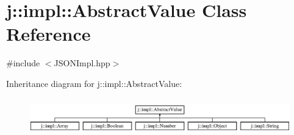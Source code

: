 \hypertarget{classj_1_1impl_1_1_abstract_value}{\section{j\-:\-:impl\-:\-:Abstract\-Value Class Reference}
\label{classj_1_1impl_1_1_abstract_value}
}


{\ttfamily \#include $<$J\-S\-O\-N\-Impl.\-hpp$>$}

Inheritance diagram for j\-:\-:impl\-:\-:Abstract\-Value\-:\begin{figure}[H]
\begin{center}
\leavevmode
\includegraphics[height=1.635036cm]{classj_1_1impl_1_1_abstract_value}
\end{center}
\end{figure}

